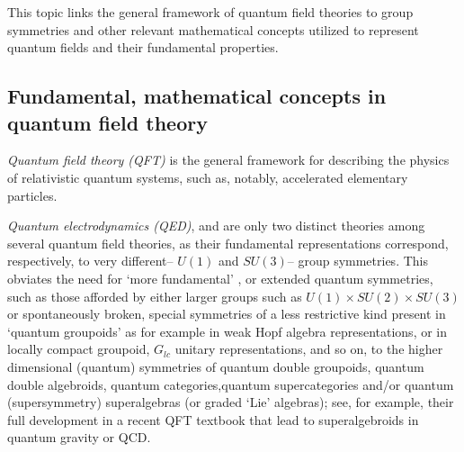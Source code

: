 \documentclass[12pt]{article}
\begin{document}
This topic links the general framework of quantum field theories to group symmetries
and other relevant mathematical concepts utilized to represent quantum fields
and their fundamental properties.  

\subsection{Fundamental, mathematical concepts in quantum field theory }

 \emph{Quantum field theory (QFT)} is the general framework for describing the physics of relativistic quantum systems, such as, notably, accelerated elementary particles. 

 \emph{Quantum electrodynamics (QED)}, and  are only two distinct theories among several quantum field theories, as their fundamental representations correspond, respectively, to very different-- $U(1)$ and $SU(3)$-- group symmetries. This obviates the need for `more fundamental' , or extended quantum symmetries, such as those afforded by either larger groups such as 
$U(1) \times SU(2) \times SU(3)$ or spontaneously broken, special symmetries of a less restrictive kind present in `quantum groupoids' as for example in weak Hopf algebra representations, or in locally compact groupoid, $G_{lc}$ unitary representations, and so on, to the higher dimensional (quantum) symmetries of quantum double groupoids, quantum double algebroids, quantum categories,quantum supercategories and/or quantum (supersymmetry) superalgebras (or graded `Lie' algebras); see, for example, their full development in a recent QFT textbook \cite{Weinberg2003} that lead to superalgebroids in quantum gravity or QCD. 
\end{document}
